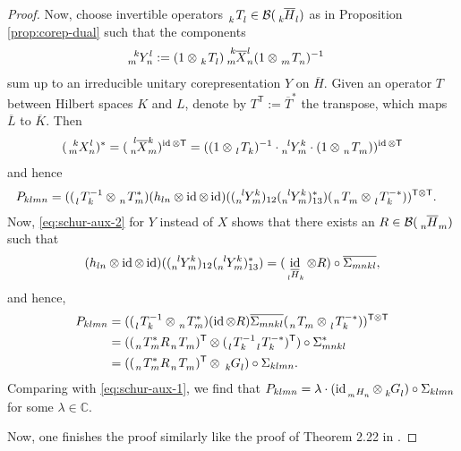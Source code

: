 \documentclass[11pt]{article}
\DeclareMathOperator{\id}{id}
\newcommand{\transpose}{\mathsf{T}}
\newcommand{\C}{\mathbb{C}}
\newcommand{\Gr}[5]{\,\tensor*[^{#2}_{#4}]{#1}{^{#3}_{#5}}}%
\newcommand{\Grd}[3]{\Gr{#1}{}{}{#2}{#3}}
\theoremstyle{definition}
\numberwithin{equation}{section}
\begin{document}
\begin{proof}
  Now, choose  invertible operators $\Grd{T}{k}{l} \in
  \mathcal{B}(\Grd{\overline{H}}{k}{l})$ as in Proposition \ref{prop:corep-dual} such that the components
  \begin{align*}
    \Gr{Y}{k}{l}{m}{n} &:= (1 \otimes \Grd{T}{k}{l}) \Gr{\overline{X}}{k}{l}{m}{n} (1 \otimes
    \Grd{T}{m}{n})^{-1} 
  \end{align*}
  sum up to an irreducible unitary corepresentation $Y$ on $\overline{H}$. 
  Given an operator $T$ between Hilbert spaces $K$ and $L$,  denote by
  $T^{\transpose}:=\overline{T}^{*}$ the transpose, which maps $\overline{L}$ to
  $\overline{K}$. Then
  \begin{align*}
    (\Gr{X}{k}{l}{m}{n})^{*}  = (\Gr{\overline{X}}{l}{k}{n}{m})^{\id \otimes \transpose} =
    ((1 \otimes \Grd{T}{l}{k})^{-1}\cdot \Gr{Y}{l}{k}{n}{m} \cdot (1\otimes \Grd{T}{n}{m}))^{\id \otimes \transpose}
  \end{align*}
  and hence
  \begin{align*}
    P_{klmn} &= ((\Gr{T}{}{-1}{l}{k} \otimes \Gr{T}{}{*}{n}{m})(h_{ln} \otimes \id \otimes
    \id)((\Gr{Y}{l}{k}{n}{m})_{12}(\Gr{Y}{l}{k}{n}{m})^{*}_{13})(\Grd{T}{n}{m} \otimes \Gr{T}{}{-*}{l}{k}))^{\transpose\otimes \transpose}.
  \end{align*}
  Now, \eqref{eq:schur-aux-2} for $Y$ instead of $X$ shows that there exists an $R\in
  \mathcal{B}(\Grd{\overline{H}}{n}{m})$ such that 
  \begin{align*}
    (h_{ln} \otimes \id \otimes
    \id)((\Gr{Y}{l}{k}{n}{m})_{12}(\Gr{Y}{l}{k}{n}{m})^{*}_{13}) = (\id_{\Grd{\overline{H}}{l}{k}}
    \otimes R)\circ \overline{\Sigma_{mnkl}},
  \end{align*}
  and hence,
  \begin{align*}
    P_{klmn} &= ((\Gr{T}{}{-1}{l}{k} \otimes \Gr{T}{}{*}{n}{m})(\id \otimes
    R)\overline{\Sigma_{mnkl}} (\Grd{T}{n}{m} \otimes \Gr{T}{}{-*}{l}{k}))^{\transpose\otimes
      \transpose} \\
    &= ((\Gr{T}{}{*}{n}{m}R \Grd{T}{n}{m})^{\transpose} \otimes
    (\Gr{T}{}{-1}{l}{k}\Gr{T}{}{-*}{l}{k})^{\transpose})\circ \Sigma_{mnkl}^{*} \\
    &=  ((\Gr{T}{}{*}{n}{m}R \Grd{T}{n}{m})^{\transpose} \otimes \Grd{G}{k}{l}) \circ \Sigma_{klmn}.
  \end{align*}
  Comparing with \eqref{eq:schur-aux-1}, we find that 
  $P_{klmn} = \lambda \cdot (\id_{\Grd{H}{m}{n}} \otimes \Grd{G}{k}{l}) \circ \Sigma_{klmn}$
  for some $\lambda \in \C$.
  
  Now, one finishes the proof similarly like the proof of Theorem 2.22 in \cite{}.
\end{proof}
\end{document}
